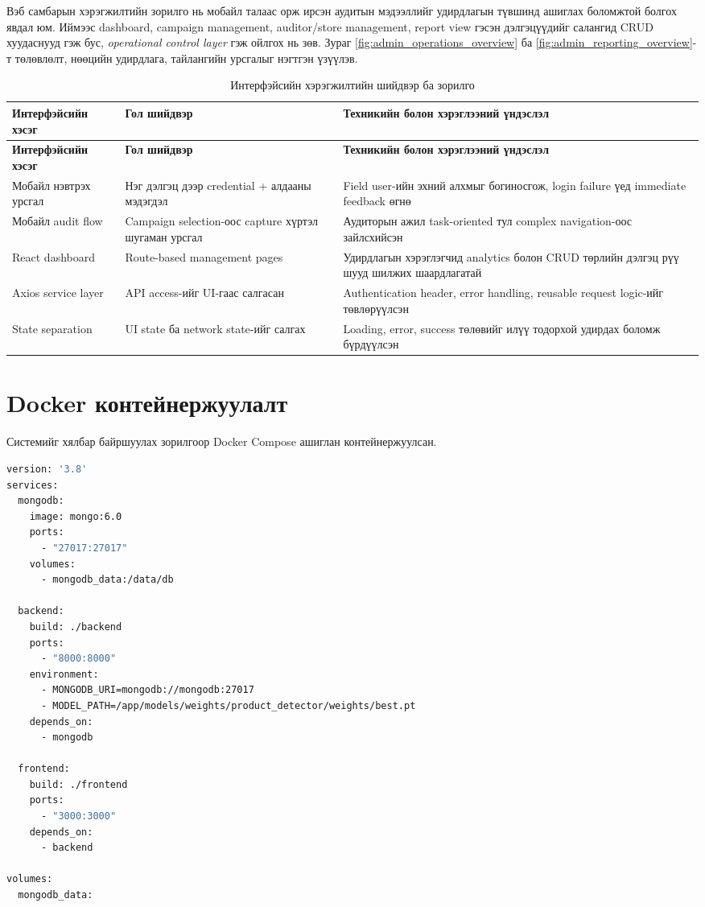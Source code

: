 Вэб самбарын хэрэгжилтийн зорилго нь мобайл талаас орж ирсэн аудитын мэдээллийг удирдлагын түвшинд ашиглах боломжтой болгох явдал юм. Иймээс dashboard, campaign management, auditor/store management, report view гэсэн дэлгэцүүдийг салангид CRUD хуудаснууд гэж бус, \textit{operational control layer} гэж ойлгох нь зөв. Зураг \ref{fig:admin_operations_overview} ба \ref{fig:admin_reporting_overview}-т төлөвлөлт, нөөцийн удирдлага, тайлангийн урсгалыг нэгтгэн үзүүлэв.

\begin{longtable}{|p{3.3cm}|p{3.9cm}|p{4.9cm}|}
\caption{Интерфэйсийн хэрэгжилтийн шийдвэр ба зорилго}
\label{tab:ui_implementation_rationale} \\
\hline
\textbf{Интерфэйсийн хэсэг} & \textbf{Гол шийдвэр} & \textbf{Техникийн болон хэрэглээний үндэслэл} \\
\hline
\endfirsthead
\hline
\textbf{Интерфэйсийн хэсэг} & \textbf{Гол шийдвэр} & \textbf{Техникийн болон хэрэглээний үндэслэл} \\
\hline
\endhead
\hline
\endfoot
Мобайл нэвтрэх урсгал & Нэг дэлгэц дээр credential + алдааны мэдэгдэл & Field user-ийн эхний алхмыг богиносгож, login failure үед immediate feedback өгнө \\
\hline
Мобайл audit flow & Campaign selection-оос capture хүртэл шугаман урсгал & Аудиторын ажил task-oriented тул complex navigation-оос зайлсхийсэн \\
\hline
React dashboard & Route-based management pages & Удирдлагын хэрэглэгчид analytics болон CRUD төрлийн дэлгэц рүү шууд шилжих шаардлагатай \\
\hline
Axios service layer & API access-ийг UI-гаас салгасан & Authentication header, error handling, reusable request logic-ийг төвлөрүүлсэн \\
\hline
State separation & UI state ба network state-ийг салгах & Loading, error, success төлөвийг илүү тодорхой удирдах боломж бүрдүүлсэн \\
\hline
\end{longtable}

\section{Docker контейнержуулалт}

Системийг хялбар байршуулах зорилгоор Docker Compose ашиглан контейнержуулсан.

\begin{lstlisting}[language=bash, caption={docker-compose.yml}]
version: '3.8'
services:
  mongodb:
    image: mongo:6.0
    ports:
      - "27017:27017"
    volumes:
      - mongodb_data:/data/db

  backend:
    build: ./backend
    ports:
      - "8000:8000"
    environment:
      - MONGODB_URI=mongodb://mongodb:27017
      - MODEL_PATH=/app/models/weights/product_detector/weights/best.pt
    depends_on:
      - mongodb

  frontend:
    build: ./frontend
    ports:
      - "3000:3000"
    depends_on:
      - backend

volumes:
  mongodb_data:
\end{lstlisting}

